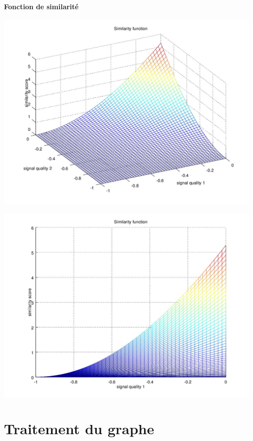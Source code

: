 \documentclass[11pt,a4paper]{article}
\begin{document}
      \paragraph{Fonction de similarité}
        \begin{center}
          \includegraphics[scale=0.5]{similarity-function.jpg}
        \end{center}
        \begin{center}
          \includegraphics[scale=0.5]{similarity-function-profil.jpg}
        \end{center}
    

\section{Traitement du graphe}
\end{document}
